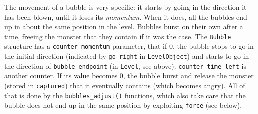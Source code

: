 \documentclass[12pt,a4paper]{article}
\newcommand{\cc}[1]{\texttt{#1}}
\begin{document}
The movement of a bubble is very specific: it starts by going in the direction it has been blown, until it loses its \textit{momentum}. When it does, all the bubbles end up in about the same position in the level. Bubbles burst on their own after a time, freeing the monster that they contain if it was the case. The \cc{Bubble} structure has a \cc{counter_momentum} parameter, that if 0, the bubble stops to go in the initial direction (indicated by \cc{go_right} in \cc{LevelObject}) and starts to go in the direction of \cc{bubble_endpoint} (in \cc{Level}, see above). \cc{counter_time_left} is another counter. If its value becomes 0, the bubble burst and release the monster (stored in \cc{captured}) that it eventually contains (which becomes angry). All of that is done by the \cc{bubbles_adjust()} functions, which also take care that the bubble does not end up in the same position by exploiting \cc{force} (see below).
\end{document}
